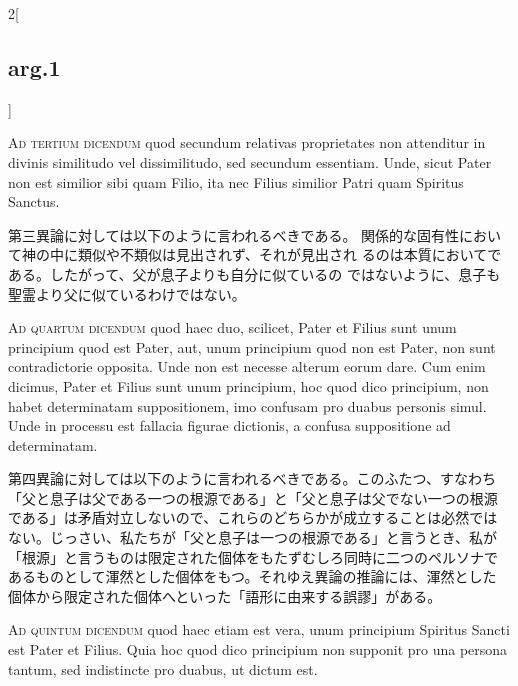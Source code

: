 \documentclass[paper=a4paper,fontsize=10pt,jafontsize=9pt,titlepage]{jlreq}
\begin{document}
\begin{paracol}{2}[\subsection{arg.1}]
\switchcolumn*[\subsection{ad.3}]

{\scshape Ad tertium dicendum} quod secundum relativas proprietates non
attenditur in divinis similitudo vel dissimilitudo, sed secundum
essentiam. Unde, sicut Pater non est similior sibi quam Filio, ita nec
Filius similior Patri quam Spiritus Sanctus.

\switchcolumn

第三異論に対しては以下のように言われるべきである。
関係的な固有性において神の中に類似や不類似は見出されず、それが見出され
 るのは本質においてである。したがって、父が息子よりも自分に似ているの
 ではないように、息子も聖霊より父に似ているわけではない。

\switchcolumn*[\subsection{ad.4}]

{\scshape Ad quartum dicendum} quod haec duo, scilicet, Pater et Filius sunt unum
principium quod est Pater, aut, unum principium quod non est Pater,
non sunt contradictorie opposita. Unde non est necesse alterum eorum
dare. Cum enim dicimus, Pater et Filius sunt unum principium, hoc quod
dico principium, non habet determinatam suppositionem, imo confusam
pro duabus personis simul. Unde in processu est fallacia figurae
dictionis, a confusa suppositione ad determinatam.

\switchcolumn

第四異論に対しては以下のように言われるべきである。このふたつ、すなわち
「父と息子は父である一つの根源である」と「父と息子は父でない一つの根源
である」は矛盾対立しないので、これらのどちらかが成立することは必然では
ない。じっさい、私たちが「父と息子は一つの根源である」と言うとき、私が
「根源」と言うものは限定された個体をもたずむしろ同時に二つのペルソナで
あるものとして渾然とした個体をもつ。それゆえ異論の推論には、渾然とした
個体から限定された個体へといった「語形に由来する誤謬」がある。

\switchcolumn*[\subsection{ad.5}]

{\scshape Ad quintum dicendum} quod haec etiam est vera, unum principium
Spiritus Sancti est Pater et Filius. Quia hoc quod dico principium non
supponit pro una persona tantum, sed indistincte pro duabus, ut dictum
est.


\end{paracol}
\end{document}
